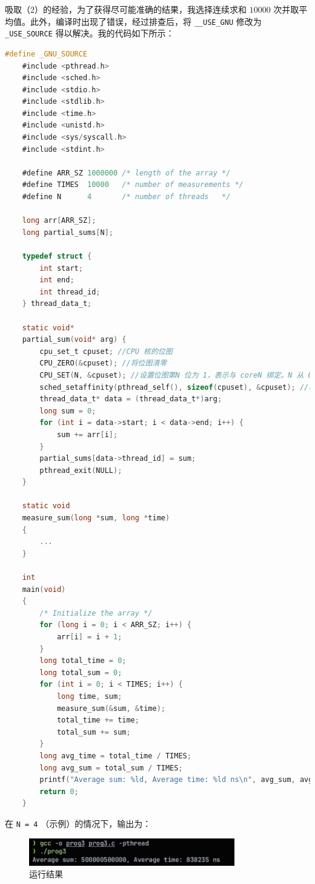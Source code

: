 吸取（2）的经验，为了获得尽可能准确的结果，我选择连续求和 $10000$ 次并取平均值。此外，编译时出现了错误，经过排查后，将 {\tt __USE_GNU} 修改为 {\tt _USE_SOURCE} 得以解决。我的代码如下所示：

\begin{lstlisting}[language=C, caption={多线程求和, 绑核}]
    #define _GNU_SOURCE
    #include <pthread.h>
    #include <sched.h>
    #include <stdio.h>
    #include <stdlib.h>
    #include <time.h>
    #include <unistd.h>
    #include <sys/syscall.h>
    #include <stdint.h>

    #define ARR_SZ 1000000 /* length of the array */
    #define TIMES  10000   /* number of measurements */
    #define N      4       /* number of threads   */

    long arr[ARR_SZ];
    long partial_sums[N];

    typedef struct {
        int start;
        int end;
        int thread_id;
    } thread_data_t;

    static void*
    partial_sum(void* arg) {
        cpu_set_t cpuset; //CPU 核的位图
        CPU_ZERO(&cpuset); //将位图清零
        CPU_SET(N, &cpuset); //设置位图第N 位为 1，表示与 coreN 绑定。N 从 0 开始计数
        sched_setaffinity(pthread_self(), sizeof(cpuset), &cpuset); //将当前线程和 cpuset 位图中指定的核绑定运行
        thread_data_t* data = (thread_data_t*)arg;
        long sum = 0;
        for (int i = data->start; i < data->end; i++) {
            sum += arr[i];
        }
        partial_sums[data->thread_id] = sum;
        pthread_exit(NULL);
    }

    static void
    measure_sum(long *sum, long *time)
    {
        ...
    }

    int
    main(void)
    {
        /* Initialize the array */
        for (long i = 0; i < ARR_SZ; i++) {
            arr[i] = i + 1;
        }
        long total_time = 0;
        long total_sum = 0;
        for (int i = 0; i < TIMES; i++) {
            long time, sum;
            measure_sum(&sum, &time);
            total_time += time;
            total_sum += sum;
        }
        long avg_time = total_time / TIMES;
        long avg_sum = total_sum / TIMES;
        printf("Average sum: %ld, Average time: %ld ns\n", avg_sum, avg_time);
        return 0;
    }

\end{lstlisting}

在 {\tt N = 4} （示例）的情况下，输出为：

\begin{figure}[H]
    \centering
    \includegraphics[width=0.8\textwidth]{fig/prog3.png}
    \caption{运行结果}
\end{figure}

